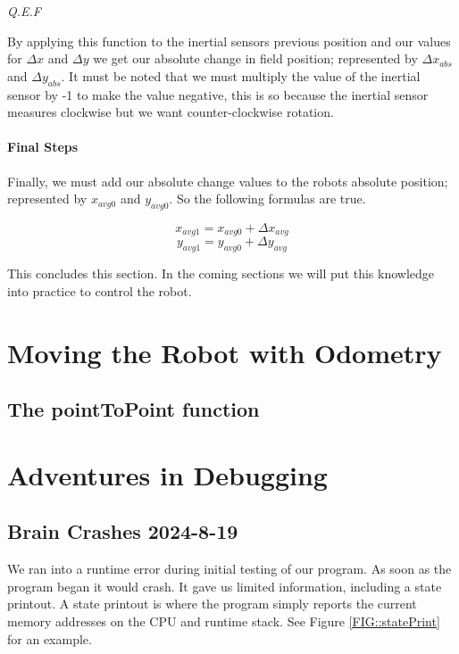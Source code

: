 \documentclass[12pt]{report}
\begin{document}
\textit{Q.E.F}

By applying this function to the inertial sensors previous position and our values for $\Delta x$ and $\Delta y$ we get our absolute change in field position; 
    represented by $\Delta x_{abs}$ and $\Delta y_{abs}$.
    It must be noted that we must multiply the value of the inertial sensor by -1 to make the value negative, 
        this is so because the inertial sensor measures clockwise but we want counter-clockwise rotation.

\subsubsection{Final Steps}
Finally, we must add our absolute change values to the robots absolute position;
    represented by $x_{avg0}$ and $y_{avg0}$. So the following formulas are true.

$$x_{avg1} = x_{avg0} + \Delta x_{avg}$$
$$y_{avg1} = y_{avg0} + \Delta y_{avg}$$

This concludes this section.
In the coming sections we will put this knowledge into practice to control the robot.

\chapter{Moving the Robot with Odometry}
\section{The pointToPoint function}

\chapter{Adventures in Debugging}

\section{Brain Crashes 2024-8-19}
We ran into a runtime error during initial testing of our program.
As soon as the program began it would crash.
It gave us limited information, including a state printout.
A state printout is where the program simply reports the current memory addresses on the CPU and runtime stack.
See Figure \ref{FIG::statePrint} for an example.
\end{document}
